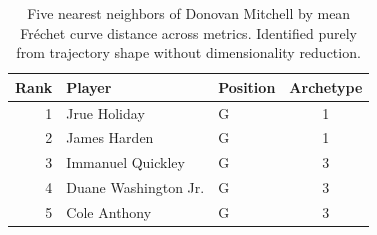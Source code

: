 \begin{table}[htbp]
  \centering\small
  \begin{tabular}{rllc}
    \toprule
    Rank & Player & Position & Archetype \\
    \midrule
    1 & Jrue Holiday & G & 1 \\
    2 & James Harden & G & 1 \\
    3 & Immanuel Quickley & G & 3 \\
    4 & Duane Washington Jr. & G & 3 \\
    5 & Cole Anthony & G & 3 \\
    \bottomrule
  \end{tabular}
  \caption{Five nearest neighbors of Donovan Mitchell by mean Fr\'{e}chet curve distance across metrics. Identified purely from trajectory shape without dimensionality reduction.}
  \label{tab:Donovan_Mitchell_frechet_curve_neighbors}
\end{table}

